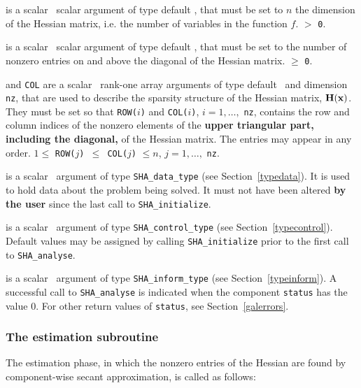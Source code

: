 \documentclass{galahad}
\newcommand{\packagename}{SHA}
\begin{document}
\vspace*{-2mm}
\begin{description}
is a scalar \intentin\ scalar argument of type default \integer, that must be 
set to $n$ the dimension of the Hessian matrix, i.e. the number of
variables in the function $f$. 
 $>$ {\tt 0}.

is a scalar \intentin\ scalar argument of type default \integer, that must be
set to the number of nonzero entries on and above the diagonal of the Hessian
matrix.
 $\ge$ {\tt 0}.

 and {\tt COL} are a scalar \intentin\ rank-one array arguments 
of type  default \integer\ and dimension {\tt nz}, that are used to describe 
the sparsity structure of the Hessian matrix, ${\mathbf{H}}({\mathbf{x}})$. 
They must be set so that
{\tt ROW(}$i${\tt)} and {\tt COL(}$i${\tt)}, $i = 1, \ldots,$ {\tt nz},
contains the row and column indices of the nonzero elements of the 
{\bf upper triangular part, including the diagonal,} of the Hessian matrix.
The entries may appear in any order.
\restrictions 
$1 \leq$ {\tt ROW(}$j${\tt) $\leq$ COL(}$j${\tt)} $\leq n$, 
$j = 1, \ldots,$ {\tt nz}.

 is a scalar \intentinout\ argument of type 
{\tt \packagename\_data\_type}
(see Section~\ref{typedata}). It is used to hold data about the problem being 
solved. It must not have been altered {\bf by the user} since the last call to 
{\tt \packagename\_initialize}.

 is a scalar \intentin\ argument of type 
{\tt \packagename\_control\_type}
(see Section~\ref{typecontrol}). Default values may be assigned by calling 
{\tt \packagename\_initialize} prior to the first call to 
{\tt \packagename\_analyse}. 

 is a scalar \intentinout\ argument of type 
{\tt \packagename\_inform\_type}
(see Section~\ref{typeinform}). 
A successful call to
{\tt \packagename\_analyse}
is indicated when the  component {\tt status} has the value 0. 
For other return values of {\tt status}, see Section~\ref{galerrors}.

\end{description}


\subsubsection{The estimation subroutine}
The estimation phase, in which the nonzero entries of the Hessian
are found by component-wise secant approximation, is called as follows:
\vspace*{1mm}
\end{document}
